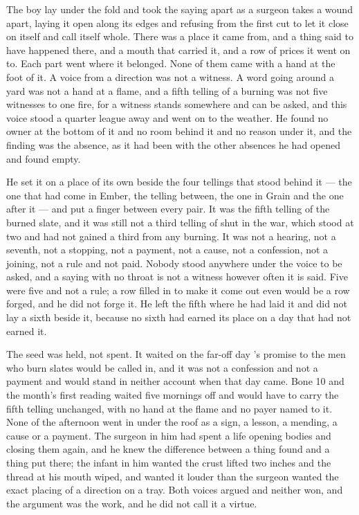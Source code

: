The boy lay under the fold and took the saying apart as a surgeon takes a wound apart, laying it open along its edges and refusing from the first cut to let it close on itself and call itself whole. There was a place it came from, and a thing said to have happened there, and a mouth that carried it, and a row of prices it went on to. Each part went where it belonged. None of them came with a hand at the foot of it. A voice from a direction was not a witness. A word going around a yard was not a hand at a flame, and a fifth telling of a burning was not five witnesses to one fire, for a witness stands somewhere and can be asked, and this voice stood a quarter league away and went on to the weather. He found no owner at the bottom of it and no room behind it and no reason under it, and the finding was the absence, as it had been with the other absences he had opened and found empty.

He set it on a place of its own beside the four tellings that stood behind it --- the one that had come in Ember, the telling between, the one in Grain and the one after it --- and put a finger between every pair. It was the fifth telling of the burned slate, and it was still not a third telling of  shut in the war, which stood at two and had not gained a third from any burning. It was not a hearing, not a seventh, not a stopping, not a payment, not a cause, not a confession, not a joining, not a rule and not paid. Nobody stood anywhere under the voice to be asked, and a saying with no throat is not a witness however often it is said. Five were five and not a rule; a row filled in to make it come out even would be a row forged, and he did not forge it. He left the fifth where he had laid it and did not lay a sixth beside it, because no sixth had earned its place on a day that had not earned it.

The seed was held, not spent. It waited on the far-off day 's promise to the men who burn slates would be called in, and it was not a confession and not a payment and would stand in neither account when that day came. Bone 10 and the month's first reading waited five mornings off and would have to carry the fifth telling unchanged, with no hand at the flame and no payer named to it. None of the afternoon went in under the roof as a sign, a lesson, a mending, a cause or a payment. The surgeon in him had spent a life opening bodies and closing them again, and he knew the difference between a thing found and a thing put there; the infant in him wanted the crust lifted two inches and the thread at his mouth wiped, and wanted it louder than the surgeon wanted the exact placing of a direction on a tray. Both voices argued and neither won, and the argument was the work, and he did not call it a virtue.

